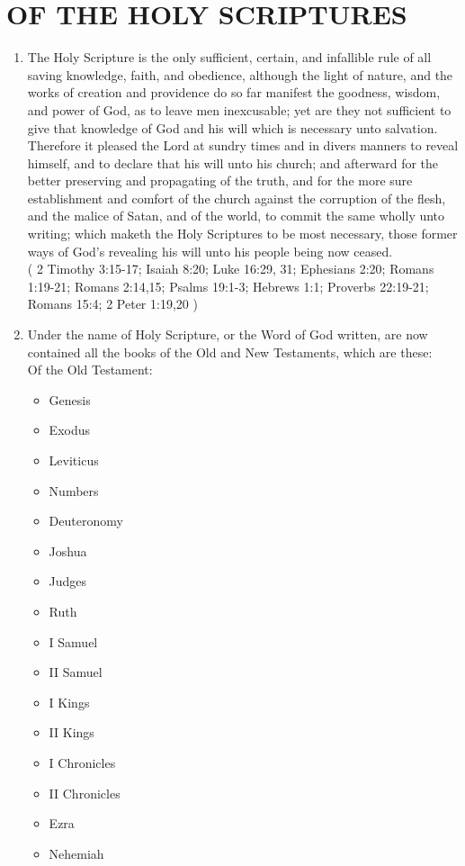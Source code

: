 \documentclass[12pt,a4paper]{book}
\begin{document}
\chapter{OF THE HOLY SCRIPTURES}
\label{ch-Scr}
\begin{enumerate}
\item
\label{ch-Scr-1}
The Holy Scripture is the only sufficient, certain, and infallible rule of all saving knowledge, faith, and obedience, although the light of nature, and the works of creation and providence do so far manifest the goodness, wisdom, and power of God, as to leave men inexcusable; yet are they not sufficient to give that knowledge of God and his will which is necessary unto salvation. Therefore it pleased the Lord at sundry times and in divers manners to reveal himself, and to declare that his will unto his church; and afterward for the better preserving and propagating of the truth, and for the more sure establishment and comfort of the church against the corruption of the flesh, and the malice of Satan, and of the world, to commit the same wholly unto writing; which maketh the Holy Scriptures to be most necessary, those former ways of God's revealing his will unto his people being now ceased.\\
( 2 Timothy 3:15-17; Isaiah 8:20; Luke 16:29, 31; Ephesians 2:20; Romans 1:19-21; Romans 2:14,15; Psalms 19:1-3; Hebrews 1:1; Proverbs 22:19-21; Romans 15:4; 2 Peter 1:19,20 )
\item
\label{ch-Scr-2}
Under the name of Holy Scripture, or the Word of God written, are now contained all the books of the Old and New Testaments, which are these:\\
Of the Old Testament:
\begin{itemize}
\item Genesis
\item Exodus
\item Leviticus
\item Numbers
\item Deuteronomy
\item Joshua
\item Judges
\item Ruth
\item I Samuel
\item II Samuel
\item I Kings
\item II Kings
\item I Chronicles
\item II Chronicles
\item Ezra
\item Nehemiah

\end{itemize}
\end{enumerate}
\end{document}
